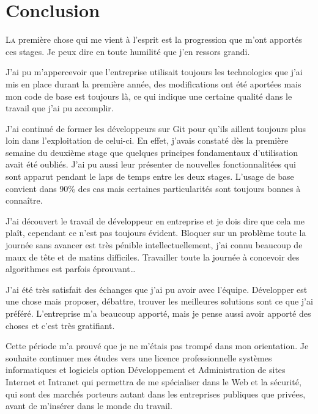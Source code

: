 \chapter{Conclusion} %
\label{cha:Conclusion}

\lettrine{L}{a} première chose qui me vient à l'esprit est la
progression que m'ont apportés ces stages. Je peux dire en toute
humilité que j'en ressors grandi.

J'ai pu m'appercevoir que l'entreprise utilisait toujours les
technologies que j'ai mis en place durant la première année, des
modifications ont été aportées mais mon code de base est toujours là, ce
qui indique une certaine qualité dans le travail que j'ai pu accomplir.

J'ai continué de former les développeurs sur Git pour qu'ils aillent
toujours plus loin dans l'exploitation de celui-ci. En effet, j'avais
constaté dès la première semaine du deuxième stage que quelques
principes fondamentaux d'utilisation avait été oubliés. J'ai pu aussi
leur présenter de nouvelles fonctionnalitées qui sont apparut pendant le
laps de temps entre les deux stages. L'usage de base convient dans
90\%{} des cas mais certaines particularités sont toujours bonnes à
connaître.

J'ai découvert le travail de développeur en entreprise et je dois dire
que cela me plaît, cependant ce n'est pas toujours évident.  Bloquer sur
un problème toute la journée sans avancer est très pénible
intellectuellement, j'ai connu beaucoup de maux de tête et de matins
difficiles. Travailler toute la journée à concevoir des algorithmes est
parfois éprouvant\dots

J'ai été très satisfait des échanges que j'ai pu avoir avec l'équipe.
Développer est une chose mais proposer, débattre, trouver les meilleures
solutions sont ce que j'ai préféré. L'entreprise m'a beaucoup apporté,
mais je pense aussi avoir apporté des choses et c'est très gratifiant.

Cette période m'a prouvé que je ne m'étais pas trompé dans mon
orientation. Je souhaite continuer mes études vers une licence
professionnelle systèmes informatiques et logiciels option \og
Développement et Administration de sites Internet et Intranet \fg{} qui
permettra de me spécialiser dans le Web et la sécurité, qui sont des
marchés porteurs autant dans les entreprises publiques que privées,
avant de m'insérer dans le monde du travail.
